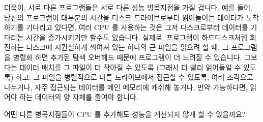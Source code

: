
더욱이, 서로 다른 프로그램들은 서로 다른 성능 병목지점을 가질 겁니다.
예를 들어, 당신의 프로그램이 대부분의 시간을 디스크 드라이브로부터 읽어들이는
데이터가 도착하기를 기다리고 있다면, 여러 CPU 를 사용하는 것은 그저
디스크로부터 데이터를 기다리는 시간을 증가시키기만 할수도 있습니다.
실제로, 프로그램이 하드디스크처럼 회전하는 디스크에 시퀀셜하게 씌여져 있는
하나의 큰 파일을 읽으려 할 때, 그 프로그램을 병렬화 하면 추가된 탐색 오버헤드
때문에 프로그램이 더 느려질 수 있습니다.
그보다는 데이터 배치를 그 파일이 더 작아질 수 있도록 (그래서 더 빨리 읽어들일
수 있도록) 하고, 그 파일을 병렬적으로 다른 드라이브에서 접근할 수 있도록, 여러
조각으로 나누거나, 자주 접근되는 데이터를 메인 메모리에 캐쉬해 놓거나, 만약
가능하다면, 읽어야 하는 데이터의 양 자체를 줄여야 합니다.


\QuickQuiz{}
	어떤 다른 병목지점들이 CPU 를 추가해도 성능을 개선되지 않게 할 수
	있을까요?

